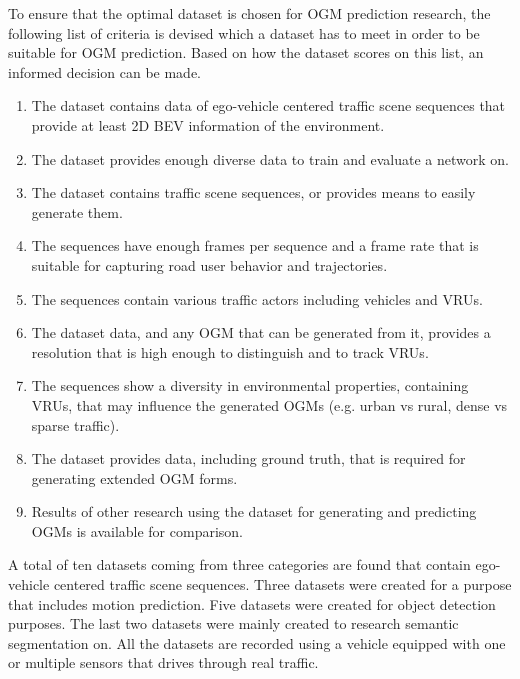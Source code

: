 To ensure that the optimal dataset is chosen for \gls{OGM} prediction research, the following list of criteria is devised which a dataset has to meet in order to be suitable for \gls{OGM} prediction. Based on how the dataset scores on this list, an informed decision can be made. 

\begin{enumerate}
	\item The dataset contains data of ego-vehicle centered traffic scene sequences that provide at least 2D \gls{BEV} information of the environment.
	\item The dataset provides enough diverse data to train and evaluate a network on.
	\item The dataset contains traffic scene sequences, or provides means to easily generate them.
	\item The sequences have enough frames per sequence and a frame rate that is suitable for capturing road user behavior and trajectories.
	\item The sequences contain various traffic actors including vehicles and \glspl{VRU}.
	\item The dataset data, and any \gls{OGM} that can be generated from it, provides a resolution that is high enough to distinguish and to track \glspl{VRU}. 	
	\item The sequences show a diversity in environmental properties, containing \glspl{VRU}, that may influence the generated \glspl{OGM} (e.g. urban vs rural, dense vs sparse traffic).
	\item The dataset provides data, including ground truth, that is required for generating extended \gls{OGM} forms.
	\item Results of other research using the dataset for generating and predicting \glspl{OGM} is available for comparison. 
\end{enumerate}


A total of ten datasets coming from three categories are found that contain ego-vehicle centered traffic scene sequences. Three datasets were created for a purpose that includes motion prediction. Five datasets were created for object detection purposes. The last two datasets were mainly created to research semantic segmentation on. All the datasets are recorded using a vehicle equipped with one or multiple sensors that drives through real traffic. \\

